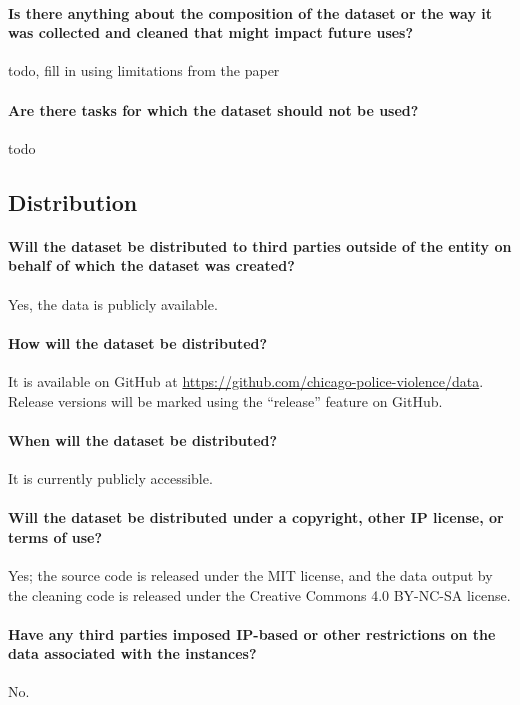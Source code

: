 \paragraph{Is there anything about the composition of the dataset or the way it was collected and cleaned that might impact future uses?}
{\color{red} todo, fill in using limitations from the paper}

\paragraph{Are there tasks for which the dataset should not be used?}
{\color{red} todo}

\subsection{Distribution}

\paragraph{Will the dataset be distributed to third parties outside of the entity on behalf of which the dataset was created?}
Yes, the data is publicly available.

\paragraph{How will the dataset be distributed?}
It is available on GitHub at \url{https://github.com/chicago-police-violence/data}.
Release versions will be marked using the ``release'' feature on GitHub.

\paragraph{When will the dataset be distributed?}
It is currently publicly accessible.

\paragraph{Will the dataset be distributed under a copyright, other IP license, or terms of use?}
Yes; the source code is released under the MIT license, and the data output by the cleaning code is released under the Creative Commons 4.0 BY-NC-SA license.

\paragraph{Have any third parties imposed IP-based or other restrictions on the data associated with the instances?}
No.


